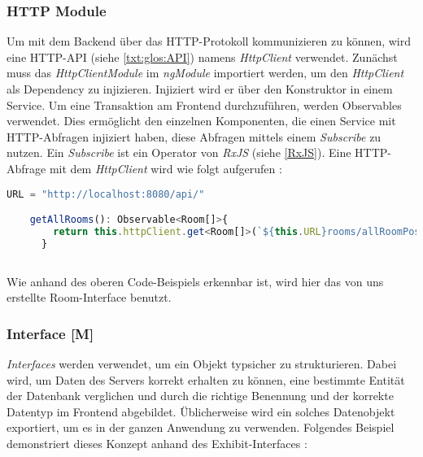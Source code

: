 \subsubsection{HTTP Module}
\label{httpService}
\label{sec:HTTPModule}
Um mit dem Backend über das HTTP-Protokoll kommunizieren zu können, wird eine HTTP-API (siehe \ref{txt:glos:API}) namens \emph{HttpClient} verwendet. Zunächst muss das \emph{HttpClientModule} im \emph{ngModule} importiert werden, um den \emph{HttpClient}  als Dependency zu injizieren. Injiziert wird er über den Konstruktor in einem Service. Um eine Transaktion am Frontend durchzuführen, werden Observables verwendet. Dies ermöglicht den einzelnen Komponenten, die einen Service mit HTTP-Abfragen injiziert haben, diese Abfragen mittels einem \emph{Subscribe} zu nutzen. Ein \emph{Subscribe} ist ein Operator von \emph{RxJS} (siehe \ref{RxJS}). Eine HTTP-Abfrage mit dem \emph{HttpClient} wird wie folgt aufgerufen \cite{AngularBuch} \cite{AngularHTTPClient}:

\begin{lstlisting}[caption={HttpClient Abfragen},  language=TypeScript,label=lst:impl:httpclientrequests]   
    URL = "http://localhost:8080/api/"

    getAllRooms(): Observable<Room[]>{
        return this.httpClient.get<Room[]>(`${this.URL}rooms/allRoomPositions`);
      }
    
\end{lstlisting}

Wie anhand des oberen Code-Beispiels erkennbar ist, wird hier das von uns erstellte Room-Interface benutzt.

\subsubsection{Interface [M]}
\label{interface}
\emph{Interfaces} werden verwendet, um ein Objekt typsicher zu strukturieren. Dabei wird, um Daten des Servers korrekt erhalten zu können, eine bestimmte Entität der Datenbank verglichen und durch die richtige Benennung und der korrekte Datentyp im Frontend abgebildet. Üblicherweise wird ein solches Datenobjekt exportiert, um es in der ganzen Anwendung zu verwenden. Folgendes Beispiel demonstriert dieses Konzept anhand des Exhibit-Interfaces \cite{AngularBuch}: 

